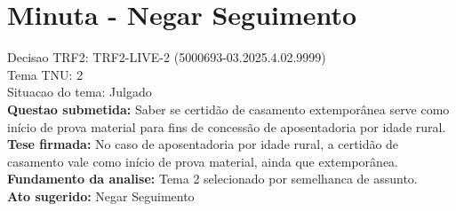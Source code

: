 \documentclass{article}
\begin{document}
\section*{Minuta - Negar Seguimento}
Decisao TRF2: TRF2-LIVE-2 (5000693-03.2025.4.02.9999)\\
Tema TNU: 2\\
Situacao do tema: Julgado\\
\textbf{Questao submetida:} Saber se certidão de casamento extemporânea serve como início de prova material para fins de concessão de aposentadoria por idade rural.\\
\textbf{Tese firmada:} No caso de aposentadoria por idade rural, a certidão de casamento vale como início de prova material, ainda que extemporânea.\\
\textbf{Fundamento da analise:} Tema 2 selecionado por semelhanca de assunto.\\
\textbf{Ato sugerido:} Negar Seguimento
\end{document}

